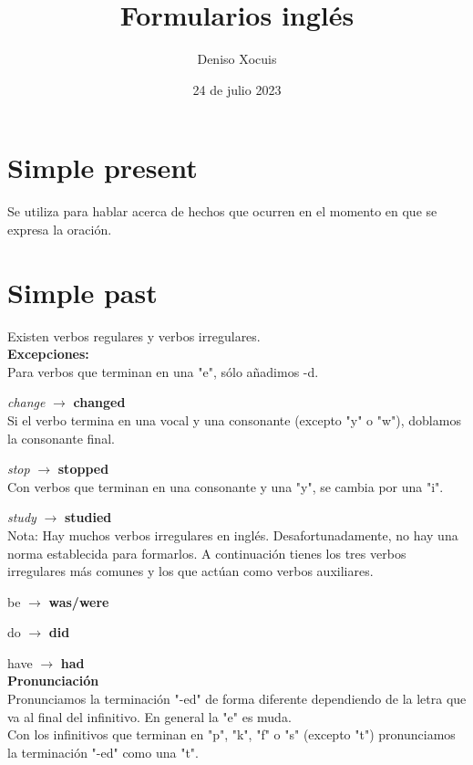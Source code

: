 \documentclass[letterpaper,12pt]{article}
\title {\textbf{Formularios inglés}}
\author{Deniso Xocuis}
\date{24 de julio 2023}
\begin{document}
\maketitle

\begin{sloppypar} 
\section{Simple present}
Se utiliza para hablar acerca de hechos que ocurren en el momento en que se expresa la oración.

\section{Simple past}
Existen verbos regulares y verbos irregulares. 
\vspace{0.3cm}\\
\textbf{Excepciones: }
\vspace{0.3cm}\\
Para verbos que terminan en una "e", sólo añadimos -d. 

\textit{change} $\rightarrow$ \textbf{changed} 
\vspace{0.3cm}\\
Si el verbo termina en una vocal y una consonante (excepto "y" o "w"), doblamos la consonante final.

\textit{stop} $\rightarrow$ \textbf{stopped}
\vspace{0.3cm}\\
Con verbos que terminan en una consonante y una "y", se cambia por una "i".

\textit{study} $\rightarrow$ \textbf{studied}
\vspace{0.3cm}\\
Nota: Hay muchos verbos irregulares en inglés. Desafortunadamente, no hay una norma establecida para formarlos. A continuación tienes los tres verbos irregulares más comunes y los que actúan como verbos auxiliares.

be $\rightarrow$ \textbf{was/were}

do $\rightarrow$ \textbf{did}

have $\rightarrow$ \textbf{had}
\vspace{0.3cm}\\
\textbf{Pronunciación}
\vspace{0.3cm}\\
Pronunciamos la terminación "-ed" de forma diferente dependiendo de la letra que va al final del infinitivo. En general la "e" es muda. 
\vspace{0.3cm}\\
Con los infinitivos que terminan en "p", "k", "f" o "s" (excepto "t") pronunciamos la terminación "-ed" como una "t".


\end{sloppypar}
\end{document}
